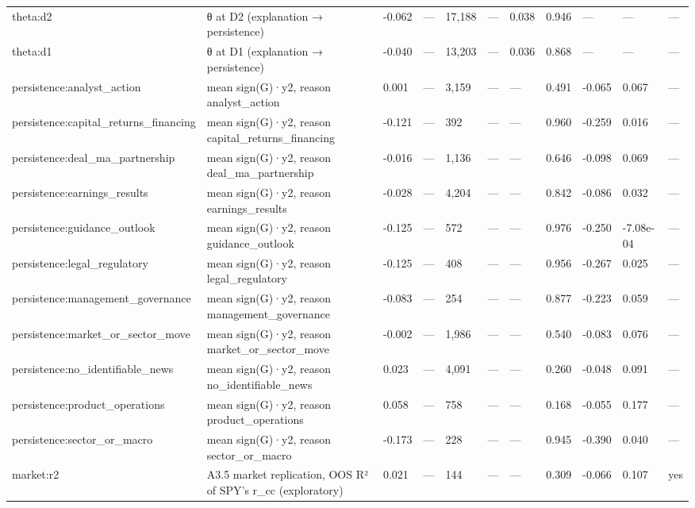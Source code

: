 \begin{tabular}{lllllllllll}
theta:d2 & θ at D2 (explanation → persistence) & -0.062 & — & 17,188 & — & 0.038 & 0.946 & — & — & — \\
theta:d1 & θ at D1 (explanation → persistence) & -0.040 & — & 13,203 & — & 0.036 & 0.868 & — & — & — \\
persistence:analyst\_action & mean sign(G)·y2, reason analyst\_action & 0.001 & — & 3,159 & — & — & 0.491 & -0.065 & 0.067 & — \\
persistence:capital\_returns\_financing & mean sign(G)·y2, reason capital\_returns\_financing & -0.121 & — & 392 & — & — & 0.960 & -0.259 & 0.016 & — \\
persistence:deal\_ma\_partnership & mean sign(G)·y2, reason deal\_ma\_partnership & -0.016 & — & 1,136 & — & — & 0.646 & -0.098 & 0.069 & — \\
persistence:earnings\_results & mean sign(G)·y2, reason earnings\_results & -0.028 & — & 4,204 & — & — & 0.842 & -0.086 & 0.032 & — \\
persistence:guidance\_outlook & mean sign(G)·y2, reason guidance\_outlook & -0.125 & — & 572 & — & — & 0.976 & -0.250 & -7.08e-04 & — \\
persistence:legal\_regulatory & mean sign(G)·y2, reason legal\_regulatory & -0.125 & — & 408 & — & — & 0.956 & -0.267 & 0.025 & — \\
persistence:management\_governance & mean sign(G)·y2, reason management\_governance & -0.083 & — & 254 & — & — & 0.877 & -0.223 & 0.059 & — \\
persistence:market\_or\_sector\_move & mean sign(G)·y2, reason market\_or\_sector\_move & -0.002 & — & 1,986 & — & — & 0.540 & -0.083 & 0.076 & — \\
persistence:no\_identifiable\_news & mean sign(G)·y2, reason no\_identifiable\_news & 0.023 & — & 4,091 & — & — & 0.260 & -0.048 & 0.091 & — \\
persistence:product\_operations & mean sign(G)·y2, reason product\_operations & 0.058 & — & 758 & — & — & 0.168 & -0.055 & 0.177 & — \\
persistence:sector\_or\_macro & mean sign(G)·y2, reason sector\_or\_macro & -0.173 & — & 228 & — & — & 0.945 & -0.390 & 0.040 & — \\
market:r2 & A3.5 market replication, OOS R² of SPY's r\_cc (exploratory) & 0.021 & — & 144 & — & — & 0.309 & -0.066 & 0.107 & yes \\
\bottomrule
\end{tabular}
